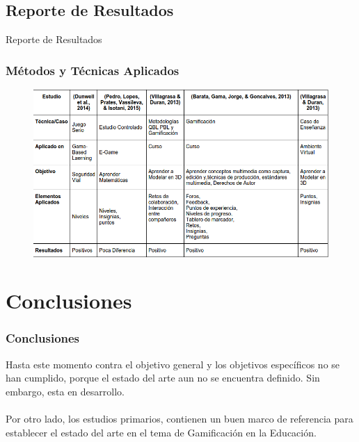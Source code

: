 \documentclass{beamer}
\begin{document}
\subsection{Reporte de Resultados} %

\begin{frame}
\Huge{\centerline{Reporte de Resultados}}
\end{frame}

\begin{frame}
    \frametitle{Métodos y Técnicas Aplicados}
    \begin{figure}
    	\begin{center}
    		\includegraphics[scale=0.4]{images/1document/comparative.png}
    	\end{center}
    \end{figure}
\end{frame}
\section{Conclusiones} %
\begin{frame}
    \frametitle{Conclusiones}
    Hasta este momento contra el objetivo general y los objetivos específicos no se han cumplido, porque el estado del arte aun no se encuentra definido. Sin embargo, esta en desarrollo.\\~\\
    Por otro lado, los estudios primarios, contienen un buen marco de referencia para establecer el estado del arte en el tema de Gamificación en la Educación.\\
    
\end{frame}
\end{document}
